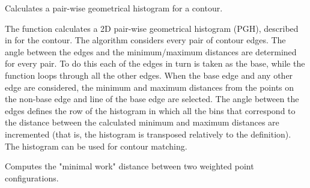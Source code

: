 Calculates a pair-wise geometrical histogram for a contour.


\begin{description}
\end{description}

The function calculates a
2D pair-wise geometrical histogram (PGH), described in
for the contour. The algorithm considers every pair of contour
edges. The angle between the edges and the minimum/maximum distances
are determined for every pair. To do this each of the edges in turn
is taken as the base, while the function loops through all the other
edges. When the base edge and any other edge are considered, the minimum
and maximum distances from the points on the non-base edge and line of
the base edge are selected. The angle between the edges defines the row
of the histogram in which all the bins that correspond to the distance
between the calculated minimum and maximum distances are incremented
(that is, the histogram is transposed relatively to the 
definition). The histogram can be used for contour matching.

Computes the "minimal work" distance between two weighted point configurations.


